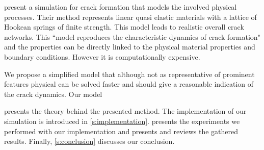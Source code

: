 

\textcite{vogel2005studies2} present a simulation for crack formation that models the involved physical processes. Their method represents linear quasi elastic materials with a lattice of Hookean springs of finite strength. This model leads to realistic overall crack networks. This ``model reproduces the characteristic dynamics of crack formation"\cite{vogel2005studies2} and the properties can be directly linked to the physical material properties and boundary conditions. However it is computationally expensive.

We propose a simplified model that although not as representative of prominent features physical can be solved faster and should give a reasonable indication of the crack dynamics. Our model 


 presents the theory behind the presented method. The implementation of our simulation is introduced in \cref{s:implementation}.  presents the experiments we performed with our implementation and presents and reviews the gathered results. Finally, \cref{s:conclusion} discusses our conclusion.